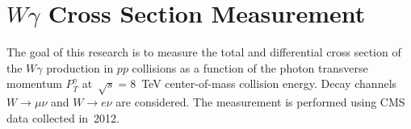 \chapter{$W\gamma$ Cross Section Measurement}
\label{sec:AN_WgMeas}

The goal of this research is to measure the total and differential cross section of the $W\gamma$ production in $pp$ collisions as a function of the photon transverse momentum $P_T^\gamma$ at~$\sqrt{s}=8$~TeV center-of-mass collision energy. Decay channels $W\rightarrow\mu\nu$ and $W\rightarrow e\nu$ are considered. The measurement is performed using CMS data collected in~2012.

